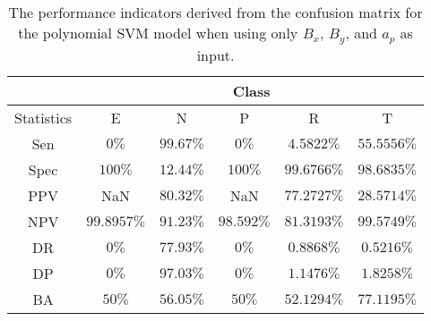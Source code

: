 \begin{table}[!ht]
	\centering
	\begin{tabular}{|c|c|c|c|c|c|}
		\hline
		 & \multicolumn{5}{c|}{Class} \\ \hline
		Statistics & E & N & P & R & T \\ \hline
		Sen & $0\%$ & $99.67\%$ & $0\%$ & $4.5822\%$ & $55.5556\%$ \\ \hline
		Spec & $100\%$ & $12.44\%$ & $100\%$ & $99.6766\%$ & $98.6835\%$ \\ \hline
		PPV & NaN & $80.32\%$ & NaN & $77.2727\%$ & $28.5714\%$ \\ \hline
		NPV & $99.8957\%$ & $91.23\%$ & $98.592\%$ & $81.3193\%$ & $99.5749\%$ \\ \hline
		DR & $0\%$ & $77.93\%$ & $0\%$ & $0.8868\%$ & $0.5216\%$ \\ \hline
		DP & $0\%$ & $97.03\%$ & $0\%$ & $1.1476\%$ & $1.8258\%$ \\ \hline
		BA & $50\%$ & $56.05\%$ & $50\%$ & $52.1294\%$ & $77.1195\%$ \\ \hline
	\end{tabular}
	\caption{The performance indicators derived from the confusion matrix for the polynomial SVM model when using only $B_{x}$, $B_{y}$, and $a_{p}$ as input.}
	\label{tab:cs:reverse:xyap:svmPoly}
\end{table}
